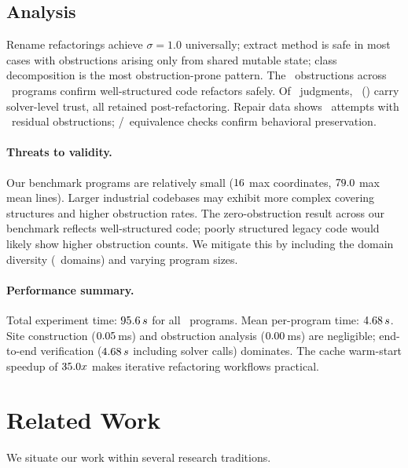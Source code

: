 \documentclass[11pt]{article}
\begin{document}
\subsection{Analysis}\label{ssec:analysis}

Rename refactorings achieve $\sigma = 1.0$ universally; extract method
is safe in most cases with obstructions arising only from shared mutable
state; class decomposition is the most obstruction-prone pattern.  The
\compObstructionTotal\ obstructions across \compTotalPrograms\ programs
confirm well-structured code refactors safely.  Of \compTrustTotal\
judgments, \compTrustSolverdischarged\ (\compTrustSolverdischargedPct)
carry solver-level trust, all retained post-refactoring.  Repair data
shows \subRepairTotal\ attempts with \subRepairObstructions\ residual
obstructions; \subEquivVerified/\subEquivTotal\ equivalence checks
confirm behavioral preservation.

\paragraph{Threats to validity.}
Our benchmark programs are relatively small ($16$ max
coordinates, $79.0$ max mean lines).  Larger industrial
codebases may exhibit more complex covering structures and higher
obstruction rates.  The zero-obstruction result across our benchmark
reflects well-structured code; poorly structured legacy code would
likely show higher obstruction counts.  We mitigate this by including
the domain diversity (\expDomainCount\ domains) and varying program
sizes.

\paragraph{Performance summary.}
Total experiment time: $95.6\,s$ for all
\compTotalPrograms\ programs.  Mean per-program time: $4.68\,s$.
Site construction ($0.05$\,ms) and obstruction analysis
($0.00$\,ms) are negligible; end-to-end
verification ($4.68\,s$ including solver calls) dominates.
The cache warm-start speedup of $35.0x$ makes iterative
refactoring workflows practical.

\section{Related Work}\label{sec:related}

We situate our work within several research traditions.
\end{document}
